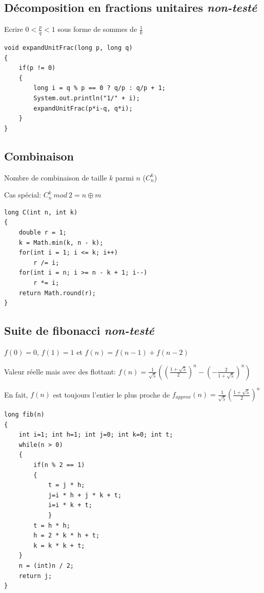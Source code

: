 \subsection{Décomposition en fractions unitaires {\footnotesize \textit{non-testé}}}
Ecrire $0<\frac{p}{q}<1$ sous forme de sommes de $\frac{1}{k}$
\begin{lstlisting}
void expandUnitFrac(long p, long q)
{
	if(p != 0)
	{
		long i = q % p == 0 ? q/p : q/p + 1;
		System.out.println("1/" + i);
		expandUnitFrac(p*i-q, q*i);
	}
}
\end{lstlisting}
\subsection{Combinaison}
Nombre de combinaison de taille $k$ parmi $n$ ($C^k_n$)

Cas spécial: $C^k_n\ mod\ 2 = n\oplus m$
\begin{lstlisting}
long C(int n, int k)
{
	double r = 1;
	k = Math.min(k, n - k);
	for(int i = 1; i <= k; i++)
		r /= i;
	for(int i = n; i >= n - k + 1; i--)
		r *= i;
	return Math.round(r);
}
\end{lstlisting}
\subsection{Suite de fibonacci {\footnotesize \textit{non-testé}}}
$f(0) = 0$, $f(1) = 1$ et $f(n) = f(n - 1) + f(n - 2)$

Valeur réelle mais avec des flottant: $f(n)=\frac{1}{\sqrt{5}}((\frac{1+\sqrt{5}}{2})^n-(-\frac{2}{1+\sqrt{5}})^n)$

En fait, $f(n)$ est toujours l'entier le plus proche de $f_{approx}(n)=\frac{1}{\sqrt{5}}(\frac{1+\sqrt{5}}{2})^n$
\begin{lstlisting}
long fib(n)
{
	int i=1; int h=1; int j=0; int k=0; int t;
	while(n > 0)
	{
		if(n % 2 == 1)
		{
			t = j * h;
			j=i * h + j * k + t; 
			i=i * k + t;
    		}
   		t = h * h;
   		h = 2 * k * h + t;
   		k = k * k + t;
	}
	n = (int)n / 2; 
	return j;
}
\end{lstlisting}

